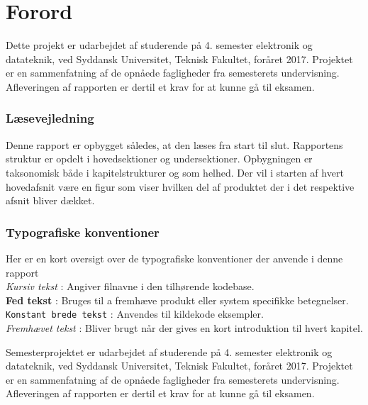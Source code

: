 \chapter*{Forord}\label{chap:forord}

Dette projekt er udarbejdet af studerende på 4. semester elektronik og datateknik, ved Syddansk Universitet, Teknisk Fakultet, foråret 2017. Projektet er en sammenfatning af de opnåede fagligheder fra semesterets undervisning. Afleveringen af rapporten er dertil et krav for at kunne gå til eksamen.


\subsection{Læsevejledning}
Denne rapport er opbygget således, at den læses fra start til slut. Rapportens struktur er opdelt i hovedsektioner og undersektioner. Opbygningen er taksonomisk både i kapitelstrukturer og som helhed. Der vil i starten af hvert hovedafsnit være en figur som viser hvilken del af produktet der i det respektive afsnit bliver dækket.

\subsection{Typografiske konventioner}
Her er en kort oversigt over de typografiske konventioner der anvende i denne rapport
\\
\textit{Kursiv tekst} : Angiver filnavne i den tilhørende kodebase.
\\
\textbf{Fed tekst} : Bruges til a fremhæve produkt eller system specifikke betegnelser.
\\
\texttt{Konstant brede tekst} : Anvendes til kildekode eksempler.
\\
\emph{Fremhævet tekst} : Bliver brugt når der gives en kort introduktion til hvert kapitel. 
\\

Semesterprojektet er udarbejdet af studerende på 4. semester elektronik og datateknik, ved Syddansk Universitet, Teknisk Fakultet, foråret 2017. Projektet er en sammenfatning af de opnåede fagligheder fra semesterets undervisning. Afleveringen af rapporten er dertil et krav for at kunne gå til eksamen.
\\ \\



